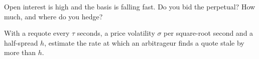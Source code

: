 \begin{interviewq}\label{iq:hf:crypto-high-frequency-trading-on-centralised-venues:5}
Open interest is high and the basis is falling fast. Do you bid the perpetual? How much, and where do you hedge?
\end{interviewq}

\begin{interviewq}\label{iq:hf:crypto-high-frequency-trading-on-centralised-venues:6}
With a requote every $\tau$ seconds, a price volatility $\sigma$ per square-root second and a half-spread $h$, estimate the rate at which an
arbitrageur finds a quote stale by more than $h$.
\end{interviewq}
